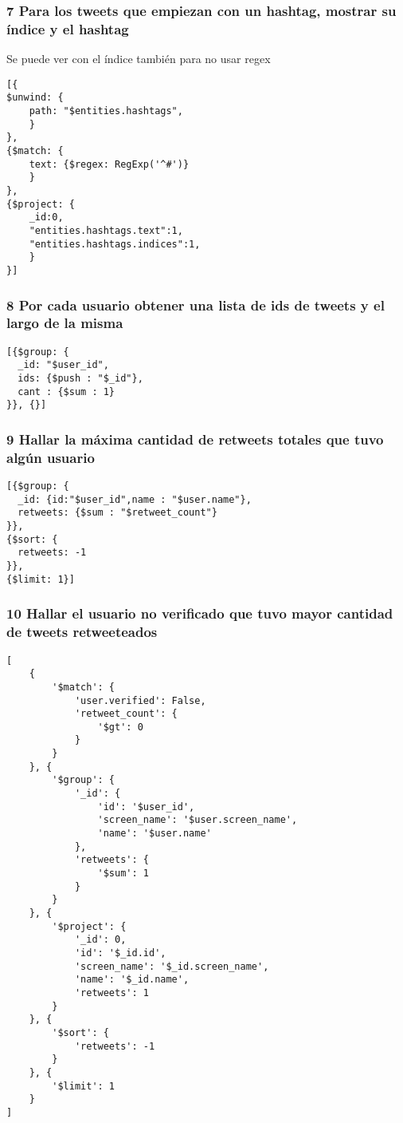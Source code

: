 \subsubsection*{7 Para los tweets que empiezan con un hashtag, mostrar su índice y el hashtag}

Se puede ver con el índice también para no usar regex
\begin{verbatim}
[{
$unwind: {
    path: "$entities.hashtags",
    }
},
{$match: {
    text: {$regex: RegExp('^#')}
    }
}, 
{$project: {
    _id:0,
    "entities.hashtags.text":1,
    "entities.hashtags.indices":1,
    }
}]
\end{verbatim}

\subsubsection*{8 Por cada usuario obtener una lista de ids de tweets y el largo de la misma}
\begin{verbatim}
[{$group: {
  _id: "$user_id",
  ids: {$push : "$_id"},
  cant : {$sum : 1}
}}, {}]
\end{verbatim}


\subsubsection*{9 Hallar la máxima cantidad de retweets totales que tuvo algún usuario}
\begin{verbatim}
[{$group: {
  _id: {id:"$user_id",name : "$user.name"},
  retweets: {$sum : "$retweet_count"}
}}, 
{$sort: {
  retweets: -1
}}, 
{$limit: 1}]

\end{verbatim}

\subsubsection*{10 Hallar el usuario no verificado que tuvo mayor cantidad de tweets retweeteados}

\begin{verbatim}
[
    {
        '$match': {
            'user.verified': False, 
            'retweet_count': {
                '$gt': 0
            }
        }
    }, {
        '$group': {
            '_id': {
                'id': '$user_id', 
                'screen_name': '$user.screen_name', 
                'name': '$user.name'
            }, 
            'retweets': {
                '$sum': 1
            }
        }
    }, {
        '$project': {
            '_id': 0, 
            'id': '$_id.id', 
            'screen_name': '$_id.screen_name', 
            'name': '$_id.name', 
            'retweets': 1
        }
    }, {
        '$sort': {
            'retweets': -1
        }
    }, {
        '$limit': 1
    }
]

\end{verbatim}

